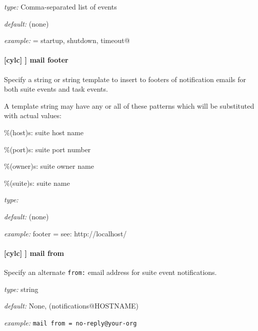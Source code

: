 \begin{myitemize}
    \item {\em type:} Comma-separated list of events
    \item {\em default:} (none)
    \item {\em example:} \lstinline@handler = startup, shutdown, timeout@
\end{myitemize}

\paragraph[mail footer]{[cylc] \textrightarrow [[events]] \textrightarrow mail footer}

Specify a string or string template to insert to footers of notification emails
for both suite events and task events.

A template string may have any or all of these patterns which will be
substituted with actual values:
\begin{myitemize}
    \item \%(host)s: suite host name
    \item \%(port)s: suite port number
    \item \%(owner)s: suite owner name
    \item \%(suite)s: suite name
\end{myitemize}

\begin{myitemize}
    \item {\em type:} 
    \item {\em default:} (none)
    \item {\em example:} \lstinline@mail footer = see: http://localhost/%(owner)s/notes-on/%(suite)s/@
\end{myitemize}

\paragraph[mail from]{[cylc] \textrightarrow [[events]] \textrightarrow mail from}

Specify an alternate \lstinline=from:= email address for suite event notifications.

\begin{myitemize}
    \item {\em type:} string
    \item {\em default:} None, (notifications@HOSTNAME)
    \item {\em example:} \lstinline|mail from = no-reply@your-org|
\end{myitemize}


